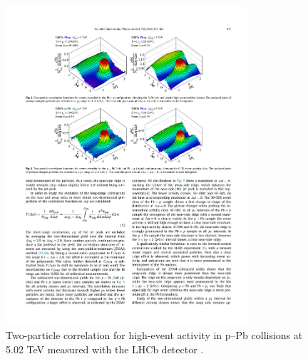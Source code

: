 \begin{figure}[htpb]
  \centering
  \includegraphics[width=0.8\textwidth]{Introduction/near_side_ridge.pdf}
  \caption{Two-particle correlation for high-event activity in p–Pb collisions at 5.02 TeV measured with the LHCb detector \cite{Aaij2016}.}
  \label{fig:near_side_ridge}
\end{figure}

